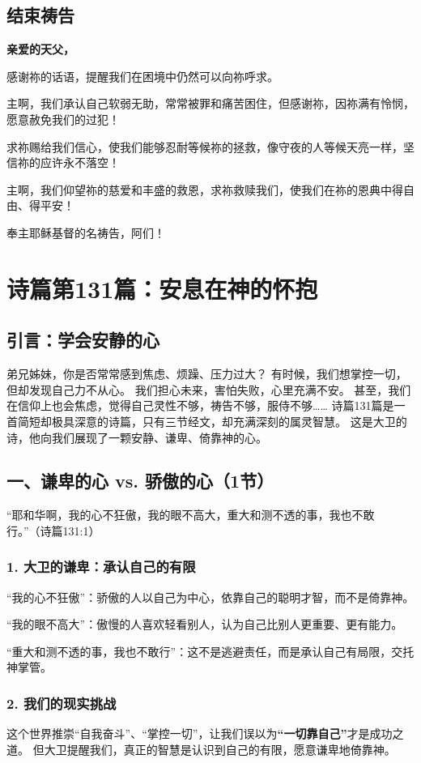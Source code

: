 \documentclass[a4paper, 12pt]{article}
\begin{document}
\subsection*{结束祷告}
\textbf{亲爱的天父，}

感谢祢的话语，提醒我们在困境中仍然可以向祢呼求。

主啊，我们承认自己软弱无助，常常被罪和痛苦困住，但感谢祢，因祢满有怜悯，愿意赦免我们的过犯！

求祢赐给我们信心，使我们能够忍耐等候祢的拯救，像守夜的人等候天亮一样，坚信祢的应许永不落空！

主啊，我们仰望祢的慈爱和丰盛的救恩，求祢救赎我们，使我们在祢的恩典中得自由、得平安！

奉主耶稣基督的名祷告，阿们！
\newpage
\section{诗篇第131篇：安息在神的怀抱}
\subsection*{引言：学会安静的心}
弟兄姊妹，你是否常常感到焦虑、烦躁、压力过大？
有时候，我们想掌控一切，但却发现自己力不从心。
我们担心未来，害怕失败，心里充满不安。
甚至，我们在信仰上也会焦虑，觉得自己灵性不够，祷告不够，服侍不够……
诗篇131篇是一首简短却极具深意的诗篇，只有三节经文，却充满深刻的属灵智慧。 这是大卫的诗，他向我们展现了一颗安静、谦卑、倚靠神的心。

\subsection*{一、谦卑的心 vs. 骄傲的心（1节）}
“耶和华啊，我的心不狂傲，我的眼不高大，重大和测不透的事，我也不敢行。”（诗篇131:1）

\subsubsection*{1. 大卫的谦卑：承认自己的有限}

\hspace{0.4cm}“我的心不狂傲”：骄傲的人以自己为中心，依靠自己的聪明才智，而不是倚靠神。

“我的眼不高大”：傲慢的人喜欢轻看别人，认为自己比别人更重要、更有能力。

“重大和测不透的事，我也不敢行”：这不是逃避责任，而是承认自己有局限，交托神掌管。
\subsubsection*{2. 我们的现实挑战}
这个世界推崇“自我奋斗”、“掌控一切”，让我们误以为\textbf{“一切靠自己”}才是成功之道。
但大卫提醒我们，真正的智慧是认识到自己的有限，愿意谦卑地倚靠神。
\end{document}
